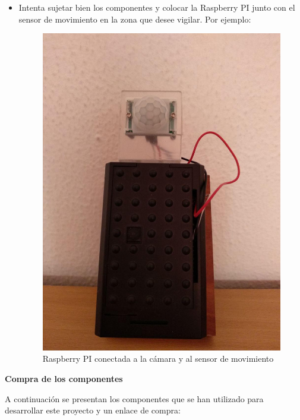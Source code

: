 \begin{itemize}
\item Intenta sujetar bien los componentes y colocar la Raspberry PI junto con el sensor de movimiento en la zona que desee vigilar. Por ejemplo:

\begin{figure}[H]
	\centering
	\includegraphics[scale=0.23]{images/56}
	\caption{Raspberry PI conectada a la cámara y al sensor de movimiento}
\end{figure}

\end{itemize}

\textbf{Compra de los componentes}

A continuación se presentan los componentes que se han utilizado para desarrollar este proyecto y un enlace de compra:

